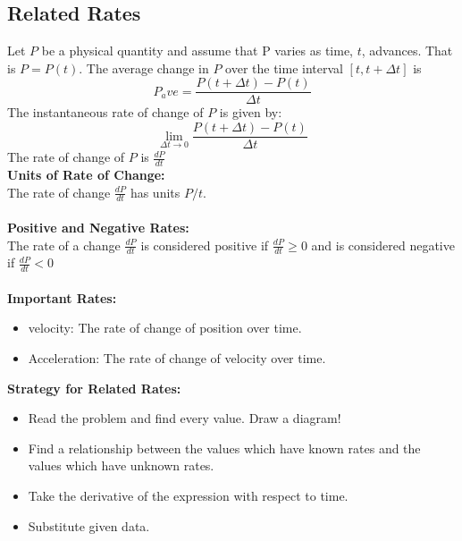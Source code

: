 \documentclass[14pt]{article}
\begin{document}
    \subsection{Related Rates}
    Let $P$ be a physical quantity and assume that P varies as time, $t$, advances. That is $P=P(t)$. The average change in $P$ over the time interval $[t, t+\Delta t]$ is 
    $$P_ave=\frac{P(t+\Delta t)-P(t)}{\Delta t}$$
    The instantaneous rate of change of $P$ is given by:
    $$\lim \limits_{\Delta t \rightarrow 0} \frac{P(t+\Delta t)-P(t)}{\Delta t}$$
    The rate of change of $P$ is $\frac{dP}{dt}$\\
    \textbf{Units of Rate of Change:}\\
    The rate of change $\frac{dP}{dt}$ has units $P/t$.\\\\
    \textbf{Positive and Negative Rates:}\\
    The rate of a change $\frac{dP}{dt}$ is considered positive if $\frac{dP}{dt}\geq0$ and is considered negative if $\frac{dP}{dt}<0$\\\\
    \textbf{Important Rates:}\\
    \begin{itemize}
        \item velocity: The rate of change of position over time.
        \item Acceleration: The rate of change of velocity over time.
    \end{itemize}
    \textbf{Strategy for Related Rates:}\\
    \begin{itemize}
        \item Read the problem and find every value. Draw a diagram!
        \item Find a relationship between the values which have known rates and the values which have unknown rates.
        \item Take the derivative of the expression with respect to time.
        \item Substitute given data.
    \end{itemize}
\end{document}
